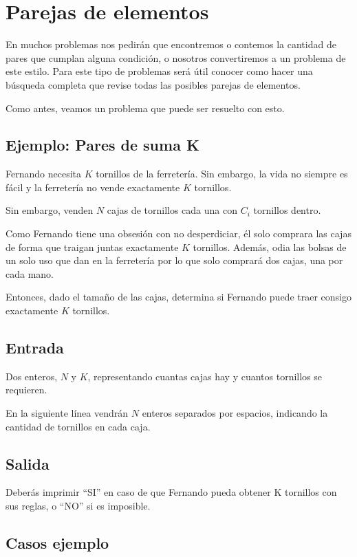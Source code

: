 \section{Parejas de elementos}


En muchos problemas nos pedirán que encontremos o contemos la cantidad de pares que cumplan alguna condición, o nosotros convertiremos a un problema de este estilo. Para este tipo de problemas será útil conocer como hacer una búsqueda completa que revise todas las posibles parejas de elementos.

Como antes, veamos un problema que puede ser resuelto con esto.

\subsection{Ejemplo: Pares de suma K}

Fernando necesita \(K\) tornillos de la ferretería. Sin embargo, la vida no siempre es fácil y la ferretería no vende exactamente \(K\) tornillos.

Sin embargo, venden \(N\) cajas de tornillos cada una con \(C_i\) tornillos dentro. 

Como Fernando tiene una obsesión con no desperdiciar, él solo comprara las cajas de forma que traigan juntas exactamente \(K\) tornillos. Además, odia las bolsas de un solo uso que dan en la ferretería por lo que solo comprará dos cajas, una por cada mano.

Entonces, dado el tamaño de las cajas, determina si Fernando puede traer consigo exactamente \(K\) tornillos.

\subsection*{Entrada}
Dos enteros, \(N\) y \(K\), representando cuantas cajas hay y cuantos tornillos se requieren.

En la siguiente línea vendrán \(N\) enteros separados por espacios, indicando la cantidad de tornillos en cada caja.

\subsection*{Salida}
Deberás imprimir “SI” en caso de que Fernando pueda obtener K tornillos con sus reglas, o “NO” si es imposible.

\subsection*{Casos ejemplo}

